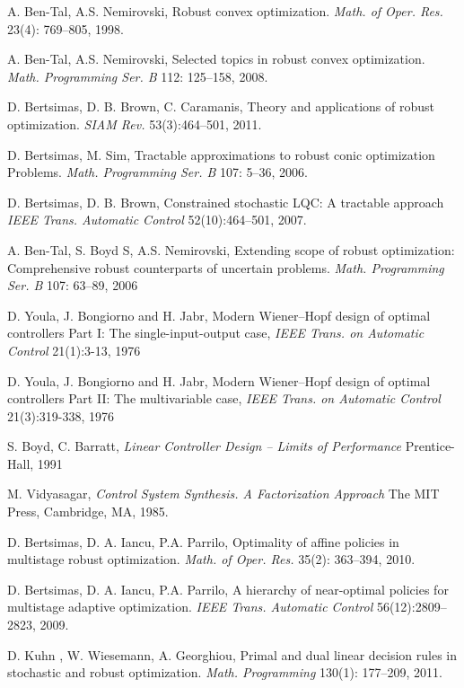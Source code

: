 \documentclass[letterpaper,11pt]{article}
\begin{document}
\begin{thebibliography}{1}
A. Ben-Tal, A.S. Nemirovski,  
Robust convex optimization.
{\it Math. of  Oper.  Res.} 23(4): 769--805, 1998.

A. Ben-Tal, A.S. Nemirovski,
Selected topics in robust convex optimization.
{\it Math. Programming Ser. B} 112: 125--158, 2008.

D. Bertsimas, D. B. Brown, C. Caramanis,  
Theory and applications of robust optimization. 
{\it SIAM Rev.} 53(3):464--501, 2011.

D. Bertsimas, M. Sim,   
Tractable approximations to robust conic optimization
Problems.
{\it Math. Programming Ser. B} 107: 5--36, 2006.

D. Bertsimas, D. B. Brown,
Constrained stochastic LQC: A tractable approach
{\it IEEE Trans. Automatic Control} 52(10):464--501, 2007.

A. Ben-Tal, S. Boyd S, A.S. Nemirovski, 
Extending scope of robust optimization: Comprehensive robust counterparts of uncertain problems.
{\it Math. Programming Ser. B} 107: 63--89, 2006

D. Youla, J. Bongiorno and H. Jabr, 
Modern Wiener--Hopf design of optimal controllers Part I: The single-input-output case, 
{\it IEEE Trans. on Automatic Control} 21(1):3-13, 1976

D. Youla, J. Bongiorno and H. Jabr, 
Modern Wiener--Hopf design of optimal controllers Part II: The multivariable case, 
{\it IEEE Trans. on Automatic Control} 21(3):319-338, 1976

S. Boyd, C. Barratt,
{\it Linear Controller Design – Limits of Performance}  
Prentice-Hall, 1991

M. Vidyasagar, 
{\it Control System Synthesis. A Factorization Approach} 
The MIT Press, Cambridge, MA, 1985.


D. Bertsimas, D. A. Iancu, P.A. Parrilo, 
Optimality of affine policies in multistage robust optimization.
{\it Math. of  Oper.  Res.} 35(2): 363--394, 2010.

D. Bertsimas, D. A. Iancu, P.A. Parrilo, 
A hierarchy of near-optimal policies for multistage adaptive optimization.
{\it IEEE Trans. Automatic Control} 56(12):2809--2823, 2009.

D. Kuhn , W. Wiesemann, A. Georghiou,
Primal and dual linear decision rules in stochastic and robust optimization.
{\it Math. Programming}  130(1): 177--209, 2011.


\end{thebibliography}
\end{document}
